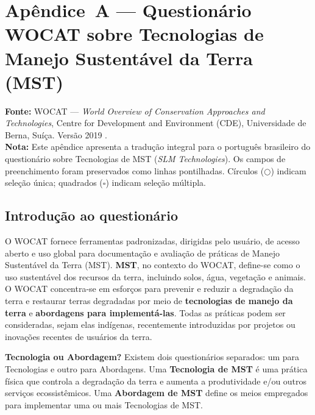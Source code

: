 
\appendix
\section*{Apêndice~A --- Questionário WOCAT sobre Tecnologias de Manejo Sustentável da Terra (MST)}
\label{app:wocat}
\setcounter{table}{0}
\renewcommand{\thetable}{A\arabic{table}}
\setcounter{figure}{0}
\renewcommand{\thefigure}{A\arabic{figure}}

\noindent\textbf{Fonte:} WOCAT --- \textit{World Overview of Conservation Approaches and Technologies}, Centre for Development and Environment (CDE), Universidade de Berna, Suíça. Versão 2019 \citep{Liniger2019}.\\[6pt]
\noindent\textbf{Nota:} Este apêndice apresenta a tradução integral para o português brasileiro do questionário sobre Tecnologias de MST (\textit{SLM Technologies}). Os campos de preenchimento foram preservados como linhas pontilhadas. Círculos ($\bigcirc$) indicam seleção única; quadrados ($\square$) indicam seleção múltipla.

\subsection*{Introdução ao questionário}

O WOCAT fornece ferramentas padronizadas, dirigidas pelo usuário, de acesso aberto e uso global para documentação e avaliação de práticas de Manejo Sustentável da Terra (MST). \textbf{MST}, no contexto do WOCAT, define-se como o uso sustentável dos recursos da terra, incluindo solos, água, vegetação e animais. O WOCAT concentra-se em esforços para prevenir e reduzir a degradação da terra e restaurar terras degradadas por meio de \textbf{tecnologias de manejo da terra} e \textbf{abordagens para implementá-las}. Todas as práticas podem ser consideradas, sejam elas indígenas, recentemente introduzidas por projetos ou inovações recentes de usuários da terra.

\medskip\noindent
\textbf{Tecnologia ou Abordagem?} Existem dois questionários separados: um para Tecnologias e outro para Abordagens. Uma \textbf{Tecnologia de MST} é uma prática física que controla a degradação da terra e aumenta a produtividade e/ou outros serviços ecossistêmicos. Uma \textbf{Abordagem de MST} define os meios empregados para implementar uma ou mais Tecnologias de MST.

